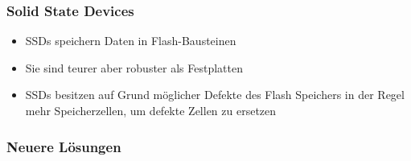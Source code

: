 	\subsubsection{Solid State Devices}
		\begin{itemize}
			\item SSDs speichern Daten in Flash-Bausteinen
			\item Sie sind teurer aber robuster als Festplatten
			\item SSDs besitzen auf Grund möglicher Defekte des Flash Speichers in der Regel mehr Speicherzellen, um defekte Zellen zu ersetzen 
		\end{itemize}
	
	\subsubsection{Neuere Lösungen}
